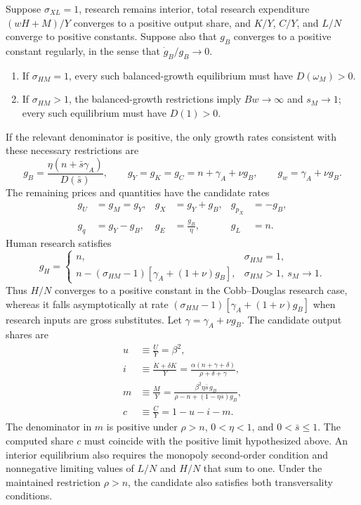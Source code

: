 \begin{proposition}
\label{prop:axm-cd-bgp}
Suppose \(\sigma_{XL}=1\), research remains interior, total research expenditure
\((wH+M)/Y\) converges to a positive output share, and \(K/Y\), \(C/Y\), and
\(L/N\) converge to positive constants. Suppose also that \(g_B\) converges to a
positive constant regularly, in the sense that \(\dot g_B/g_B\to0\).

\begin{enumerate}[label=(\roman*)]
\item If \(\sigma_{HM}=1\), every such balanced-growth equilibrium must have
 \(D(\omega_M)>0\).
\item If \(\sigma_{HM}>1\), the balanced-growth restrictions imply
 \(Bw\to\infty\) and \(s_M\to1\); every such equilibrium must have \(D(1)>0\).
\end{enumerate}

If the relevant denominator is positive, the only growth rates consistent with
these necessary restrictions are
\begin{equation}
 g_B=\frac{\eta(n+\bar s\gamma_A)}{D(\bar s)},\qquad
 g_Y=g_K=g_C=n+\gamma_A+\nu g_B,\qquad
 g_w=\gamma_A+\nu g_B.
 \label{eq:axm-cd-growth-rates}
\end{equation}
The remaining prices and quantities have the candidate rates
\begin{align}
 g_U&=g_M=g_Y,&
 g_X&=g_Y+g_B,&
 g_{p_X}&=-g_B,\\
 g_q&=g_Y-g_B,&
 g_E&=\frac{g_B}{\eta},&
 g_L&=n.
 \label{eq:axm-cd-remaining-rates}
\end{align}
Human research satisfies
\begin{equation}
 g_H=
 \begin{cases}
 n,&\sigma_{HM}=1,\\
 n-(\sigma_{HM}-1)[\gamma_A+(1+\nu)g_B],
 &\sigma_{HM}>1,\ s_M\to1.
 \end{cases}
 \label{eq:axm-human-research-growth}
\end{equation}
Thus \(H/N\) converges to a positive constant in the Cobb--Douglas research
case, whereas it falls asymptotically at rate
\((\sigma_{HM}-1)[\gamma_A+(1+\nu)g_B]\) when research inputs are gross substitutes.
Let \(\gamma=\gamma_A+\nu g_B\). The candidate output shares are
\begin{align}
 u&\equiv\frac{U}{Y}=\beta^2,\\
 i&\equiv\frac{\dot K+\delta K}{Y}
 =\frac{\alpha(n+\gamma+\delta)}{\rho+\delta+\gamma},\\
 m&\equiv\frac{M}{Y}
 =\frac{\beta^2\eta\bar s\,g_B}
 {\rho-n+(1-\eta\bar s)g_B},\\
 c&\equiv\frac{C}{Y}=1-u-i-m.
 \label{eq:axm-cd-shares}
\end{align}
The denominator in \(m\) is positive under \(\rho>n\), \(0<\eta<1\), and
\(0<\bar s\leq1\).
The computed share \(c\) must coincide with the positive limit hypothesized above.
An interior equilibrium also requires the monopoly second-order condition and
nonnegative limiting values of \(L/N\) and \(H/N\) that sum to one. Under the
maintained restriction \(\rho>n\), the candidate also satisfies both
transversality conditions.
\end{proposition}

